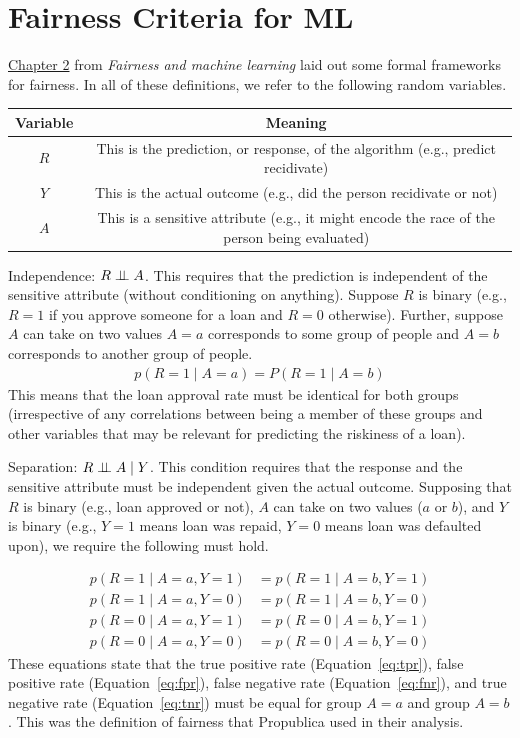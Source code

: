 \documentclass{tufte-handout}
\begin{document}
\section{Fairness Criteria for ML}

\href{https://fairmlbook.org/classification.html}{Chapter 2} from \emph{Fairness and machine learning} laid out some formal frameworks for fairness.  In all of these definitions, we refer to the following random variables.

\vspace{1em}
\begin{tabular}{c | c}
\textbf{Variable} & \textbf{Meaning} \\
\hline
$R$ & This is the prediction, or response, of the algorithm (e.g., predict recidivate) \\
$Y$ & This is the actual outcome (e.g., did the person recidivate or not) \\
$A$ & This is a sensitive attribute (e.g., it might encode the race of the person being evaluated)
\end{tabular}


\bi
\item Independence: $R \perp\!\!\!\perp A$.  This requires that the prediction is independent of the sensitive attribute (without conditioning on anything).  Suppose $R$ is binary (e.g., $R=1$ if you approve someone for a loan and $R=0$ otherwise).  Further, suppose $A$ can take on two values $A=a$ corresponds to some group of people and $A=b$ corresponds to another group of people.
\begin{align}
p(R=1\mid A=a) = P(R=1 \mid A=b)
\end{align}
This means that the loan approval rate must be identical for both groups (irrespective of any correlations between being a member of these groups and other variables that may be relevant for predicting the riskiness of a loan).

\item Separation: $R \perp\!\!\!\perp A \mid Y$.  This condition requires that the response and the sensitive attribute must be independent given the actual outcome.  Supposing that $R$ is binary (e.g., loan approved or not), $A$ can take on two values ($a$ or $b$), and $Y$ is binary (e.g., $Y=1$ means loan was repaid, $Y=0$ means loan was defaulted upon), we require the following must hold.

\begin{align}
p(R=1 \mid A=a, Y=1) &= p(R=1 \mid A=b, Y=1) \label{eq:tpr} \\
p(R=1 \mid A=a, Y=0) &= p(R=1 \mid A=b, Y=0) \label{eq:fpr} \\
p(R=0 \mid A=a, Y=1) &= p(R=0 \mid A=b, Y=1) \label{eq:fnr} \\
p(R=0 \mid A=a, Y=0) &= p(R=0 \mid A=b, Y=0) \label{eq:tnr}
\end{align}
These equations state that the true positive rate (Equation~\ref{eq:tpr}), false positive rate (Equation~\ref{eq:fpr}), false negative rate (Equation~\ref{eq:fnr}), and true negative rate (Equation~\ref{eq:tnr}) must be equal for group $A=a$ and group $A=b$.  This was the definition of fairness that Propublica used in their analysis.
\end{document}

